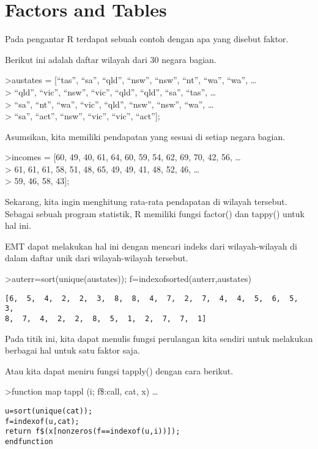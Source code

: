\documentclass[
]{book}
\begin{document}
\section{Factors and Tables}\label{factors-and-tables}

Pada pengantar R terdapat sebuah contoh dengan apa yang disebut faktor.

Berikut ini adalah daftar wilayah dari 30 negara bagian.

\textgreater austates = {[}``tas'', ``sa'', ``qld'', ``nsw'', ``nsw'', ``nt'', ``wa'', ``wa'', \ldots{}\\
\textgreater{} ``qld'', ``vic'', ``nsw'', ``vic'', ``qld'', ``qld'', ``sa'', ``tas'', \ldots{}\\
\textgreater{} ``sa'', ``nt'', ``wa'', ``vic'', ``qld'', ``nsw'', ``nsw'', ``wa'', \ldots{}\\
\textgreater{} ``sa'', ``act'', ``nsw'', ``vic'', ``vic'', ``act''{]};

Asumsikan, kita memiliki pendapatan yang sesuai di setiap negara bagian.

\textgreater incomes = {[}60, 49, 40, 61, 64, 60, 59, 54, 62, 69, 70, 42, 56, \ldots{}\\
\textgreater{} 61, 61, 61, 58, 51, 48, 65, 49, 49, 41, 48, 52, 46, \ldots{}\\
\textgreater{} 59, 46, 58, 43{]};

Sekarang, kita ingin menghitung rata-rata pendapatan di wilayah tersebut. Sebagai sebuah program statistik, R memiliki fungsi factor() dan tappy() untuk hal ini.

EMT dapat melakukan hal ini dengan mencari indeks dari wilayah-wilayah di dalam daftar unik dari wilayah-wilayah tersebut.

\textgreater auterr=sort(unique(austates)); f=indexofsorted(auterr,austates)

\begin{verbatim}
[6,  5,  4,  2,  2,  3,  8,  8,  4,  7,  2,  7,  4,  4,  5,  6,  5,  3,
8,  7,  4,  2,  2,  8,  5,  1,  2,  7,  7,  1]
\end{verbatim}

Pada titik ini, kita dapat menulis fungsi perulangan kita sendiri untuk melakukan berbagai hal untuk satu faktor saja.

Atau kita dapat meniru fungsi tapply() dengan cara berikut.

\textgreater function map tappl (i; f\$:call, cat, x) \ldots{}

\begin{verbatim}
u=sort(unique(cat));
f=indexof(u,cat);
return f$(x[nonzeros(f==indexof(u,i))]);
endfunction
\end{verbatim}
\end{document}

